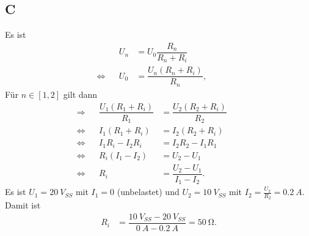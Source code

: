 \documentclass[a4paper,12pt]{article}
\numberwithin{equation}{section}
\begin{document}
\subsection{C}
Es ist
\begin{align} 
        &&U_n&=U_0\dfrac{R_n}{R_n+R_i}&&\\
        \Leftrightarrow &&U_0&=\dfrac{U_n\left(R_n+R_i\right)}{R_n},&&
\end{align} 
Für $n  \in  \left[1,2\right]$ gilt dann
\begin{align} 
        \Rightarrow &&\dfrac{U_1\left(R_1+R_i\right)}{R_1}&=\dfrac{U_2\left(R_2+R_i\right)}{R_2}&&\\
        \Leftrightarrow &&I_1\left(R_1+R_i\right)&=I_2\left(R_2+R_i\right)&&\nonumber \\
        \Leftrightarrow &&I_1R_i-I_2R_i&=I_2R_2-I_1R_1&&\nonumber \\
        \Leftrightarrow &&R_i\left(I_1-I_2\right)&=U_2-U_1&&\nonumber \\
        \Leftrightarrow &&R_i&=\dfrac{U_2-U_1}{I_1-I_2}.&&
\end{align} 
Es ist $U_1=\SI{20}{V_{SS}}$ mit $I_1=0$ (unbelastet) und $U_2=\SI{10}{V_{SS}}$ mit $I_2=\tfrac{U_2}{R_2}=\SI{0.2}{A}$.
Damit ist 
\begin{align} 
        R_i&=\dfrac{\SI{10}{V_{SS}}-\SI{20}{V_{SS} }}{\SI{0}{A}-\SI{0.2}{A}}=\SI{50}{\ohm}.
\end{align} 
\end{document}
